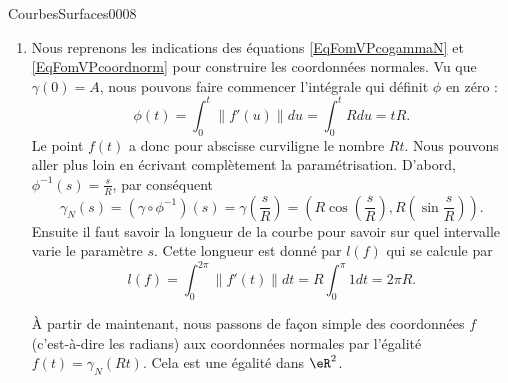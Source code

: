 \begin{corrige}{CourbesSurfaces0008}

	\begin{enumerate}
		\item
				
			Nous reprenons les indications des équations \eqref{EqFomVPcogammaN} et \eqref{EqFomVPcoordnorm} pour construire les coordonnées normales. Vu que $\gamma(0)=A$, nous pouvons faire commencer l'intégrale qui définit $\phi$ en zéro :
			\begin{equation}
				\phi(t)=\int_0^t\| f'(u) \|du=\int_0^t Rdu=tR.
			\end{equation}
			Le point $f(t)$ a donc pour abscisse curviligne le nombre $Rt$. Nous pouvons aller plus loin en écrivant complètement la paramétrisation. D'abord, $\phi^{-1}(s)=\frac{ s }{ R }$, par conséquent
			\begin{equation}
				\gamma_N(s)=(\gamma\circ\phi^{-1})(s)=\gamma(\frac{ s }{ R })=\left( R\cos(\frac{ s }{ R }),R(\sin\frac{ s }{ R }) \right).
			\end{equation}
			Ensuite il faut savoir la longueur de la courbe pour savoir sur quel intervalle varie le paramètre $s$. Cette longueur est donné par $l(f)$ qui se calcule par
			\begin{equation}
				l(f)=\int_0^{2\pi}\| f'(t) \|dt=R\int_0^{\pi}1dt=2\pi R.
			\end{equation}
	
			À partir de maintenant, nous passons de façon simple des coordonnées $f$ (c'est-à-dire les radians) aux coordonnées normales par l'égalité $f(t)=\gamma_N(Rt)$. Cela est une égalité dans $\eR^2$.


\end{enumerate}
\end{corrige}
